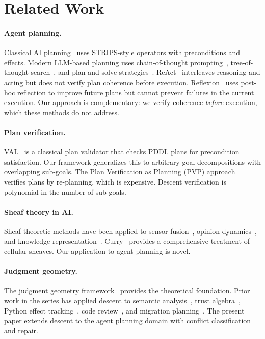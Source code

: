 \documentclass[11pt]{article}
\begin{document}
\section{Related Work}\label{sec:related}

\paragraph{Agent planning.}
Classical AI planning~\cite{ghallab2004automated,nau2004automated}
uses STRIPS-style operators with preconditions and effects.
Modern LLM-based planning uses chain-of-thought
prompting~\cite{cot}, tree-of-thought search~\cite{tot},
and plan-and-solve strategies~\cite{planandsolve}.
ReAct~\cite{react} interleaves reasoning and acting but does
not verify plan coherence before execution.
Reflexion~\cite{reflexion} uses post-hoc reflection to improve
future plans but cannot prevent failures in the current execution.
Our approach is complementary: we verify coherence \emph{before}
execution, which these methods do not address.

\paragraph{Plan verification.}
VAL~\cite{howey2004val} is a classical plan validator that checks
PDDL plans for precondition satisfaction.  Our framework
generalizes this to arbitrary goal decompositions with overlapping
sub-goals.  The Plan Verification as Planning (PVP)
approach~\cite{pvp} verifies plans by re-planning, which is
expensive.  Descent verification is polynomial in the number of
sub-goals.

\paragraph{Sheaf theory in AI.}
Sheaf-theoretic methods have been applied to sensor
fusion~\cite{robinson2014topological}, opinion
dynamics~\cite{hansen2019opinion}, and knowledge
representation~\cite{goguen1992sheaf}.
Curry~\cite{curry2014sheaves} provides a comprehensive treatment
of cellular sheaves.  Our application to agent planning is novel.

\paragraph{Judgment geometry.}
The judgment geometry framework~\cite{paper00} provides the
theoretical foundation.  Prior work in the series has applied
descent to semantic analysis~\cite{paper01,paper03},
trust algebra~\cite{paper04}, Python effect
tracking~\cite{paper07,paper24}, code review~\cite{paper67},
and migration planning~\cite{paper63}.  The present paper
extends descent to the agent planning domain with conflict
classification and repair.
\end{document}
